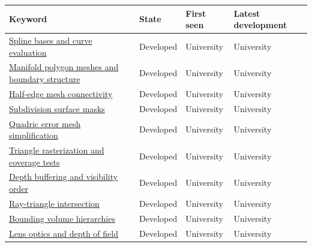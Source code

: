 {\def\LTcaptype{none} %
\begin{longtable}[]{@{}
  >{\raggedright\arraybackslash}p{}
  >{\raggedright\arraybackslash}p{}
  >{\raggedright\arraybackslash}p{}
  >{\raggedright\arraybackslash}p{}@{}}
\toprule\noalign{}
\begin{minipage}[b]{\linewidth}\raggedright
Keyword
\end{minipage} & \begin{minipage}[b]{\linewidth}\raggedright
State
\end{minipage} & \begin{minipage}[b]{\linewidth}\raggedright
First seen
\end{minipage} & \begin{minipage}[b]{\linewidth}\raggedright
Latest development
\end{minipage} \\
\midrule\noalign{}
\endhead
\bottomrule\noalign{}
\endlastfoot
\hyperref[appendix-f28eeec97a3d]{Spline bases and curve evaluation} & Developed & University & University \\
\hyperref[appendix-fab348609369]{Manifold polygon meshes and boundary structure} & Developed & University & University \\
\hyperref[appendix-1aea26b2307f]{Half-edge mesh connectivity} & Developed & University & University \\
\hyperref[appendix-0234ab7f86b1]{Subdivision surface masks} & Developed & University & University \\
\hyperref[appendix-1dd4ad54ca57]{Quadric error mesh simplification} & Developed & University & University \\
\hyperref[appendix-ed3f9bc298fe]{Triangle rasterization and coverage tests} & Developed & University & University \\
\hyperref[appendix-97578ed97952]{Depth buffering and visibility order} & Developed & University & University \\
\hyperref[appendix-47ac1bd6d144]{Ray-triangle intersection} & Developed & University & University \\
\hyperref[appendix-0b426c47dd78]{Bounding volume hierarchies} & Developed & University & University \\
\hyperref[appendix-21f8456e2629]{Lens optics and depth of field} & Developed & University & University \\

\end{longtable}}
